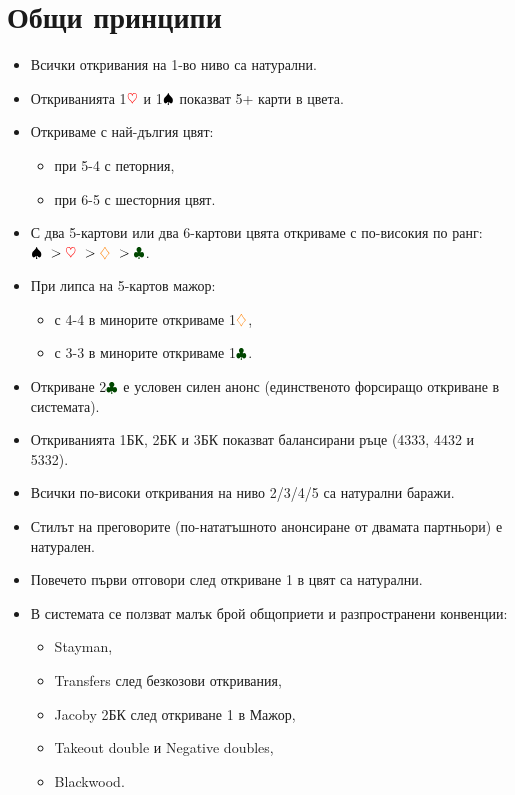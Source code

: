 \documentclass[10pt,a5paper]{extarticle}
\newcommand{\Rheart}{\textcolor{red}{\heartsuit}}
\newcommand{\Rdiamond}{\textcolor{orange}{\diamondsuit}}
\newcommand{\Bspade}{\textcolor{black}{\spadesuit}}
\newcommand{\Bclub}{\textcolor{darkgreen}{\clubsuit}}
\begin{document}
\tableofcontents

\newpage
\section{Общи принципи}

\begin{itemize}
  \item[] Всички откривания на 1-во ниво са натурални.
  \item[] Откриванията 1$\Rheart$ и 1$\Bspade$ показват 5+ карти в цвета.
  \item[] Откриваме с най-дългия цвят:
    \begin{itemize}
      \item[] при 5-4 с петорния,
      \item[] при 6-5 с шесторния цвят.
    \end{itemize}
  \item[] С два 5-картови или два 6-картови цвята откриваме с по-високия по ранг: $\Bspade\ > \Rheart\ > \Rdiamond\ > \Bclub$.
  \item[] При липса на 5-картов мажор:
    \begin{itemize}
      \item[] с 4-4 в минорите откриваме 1$\Rdiamond$,
      \item[] с 3-3 в минорите откриваме 1$\Bclub$.
    \end{itemize}
  \item[] Откриване 2$\Bclub$ е условен силен анонс (единственото форсиращо откриване в системата).
  \item[] Откриванията 1БК, 2БК и 3БК показват балансирани ръце (4333, 4432 и 5332).
  \item[] Всички по-високи откривания на ниво 2/3/4/5 са натурални баражи.
  \item[] Стилът на преговорите (по-нататъшното анонсиране от двамата партньори) е натурален.
  \item[] Повечето първи отговори след откриване 1 в цвят са натурални.
  \item[] В системата се ползват малък брой общоприети и разпространени конвенции:
    \begin{itemize}
      \item[] Stayman,
      \item[] Transfers след безкозови откривания,
      \item[] Jacoby 2БК след откриване 1 в Мажор,
      \item[] Takeout double и Negative doubles,
      \item[] Blackwood.
    \end{itemize}
\end{itemize}
\end{document}
